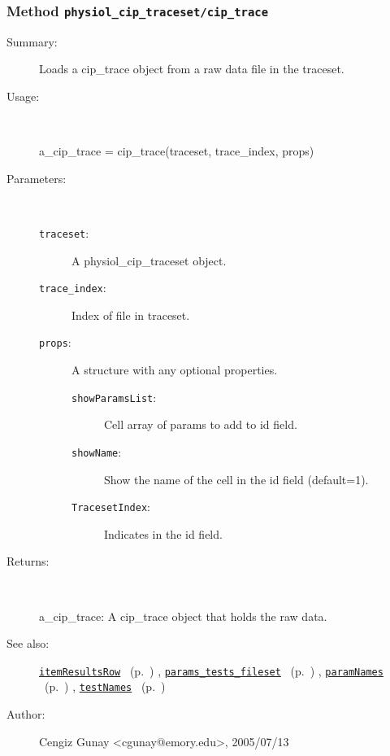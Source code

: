 \subsubsection[Method \texttt{cip\_trace}]{Method \texttt{physiol\_cip\_traceset/cip\_trace}}%
%
\label{ref_physiol_cip_traceset__cip_trace}%
\hypertarget{ref_physiol_cip_traceset__cip_trace}{}%
\begin{description}
\item[Summary:]Loads a cip\_trace object from a raw data file in the traceset.
%
\item[Usage:]~%
\begin{lyxcode}%
a\_cip\_trace = cip\_trace(traceset, trace\_index, props)
%
\end{lyxcode}%
%
%
\item[Parameters:]~
\begin{description}%
\item[\texttt{traceset}:]
 A physiol\_cip\_traceset object.
\item[\texttt{trace\_index}:]
 Index of file in traceset.
\item[\texttt{props}:]
 A structure with any optional properties.
\begin{description}%
\item[\texttt{showParamsList}:]
 Cell array of params to add to id field.
\item[\texttt{showName}:]
 Show the name of the cell in the id field (default=1).
\item[\texttt{TracesetIndex}:]
 Indicates in the id field.
\end{description}%
\end{description}%
%
\item[Returns:
]~

	a\_cip\_trace: A cip\_trace object that holds the raw data.
%
%
\item[See also:]%
\hyperlink{ref_itemResultsRow}{\texttt{itemResultsRow}}%
\ (p.~\pageref{ref_itemResultsRow})%
%
, \hyperlink{ref_params_tests_fileset}{\texttt{params\_tests\_fileset}}%
\ (p.~\pageref{ref_params_tests_fileset})%
%
, \hyperlink{ref_paramNames}{\texttt{paramNames}}%
\ (p.~\pageref{ref_paramNames})%
%
, \hyperlink{ref_testNames}{\texttt{testNames}}%
\ (p.~\pageref{ref_testNames})%
%
%
\item[Author:]%
Cengiz Gunay <cgunay@emory.edu>, 2005/07/13
%
\end{description}
\methodline%
